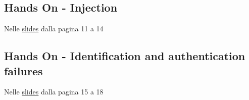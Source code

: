 \subsection{Hands On - Injection}\label{hands-on---injection}

Nelle
\href{https://liveunibo.sharepoint.com/sites/LoPTSI_SedediImola/Shared\%20Documents/Forms/AllItems.aspx?FolderCTID=0x0120005FAD3FA7D5B32649A4AF4CAF3AE22536&id=\%2Fsites\%2FLoPTSI\%5FSedediImola\%2FShared\%20Documents\%2FLABORATORIO\%20DI\%20SICUREZZA\%20DEI\%20SISTEMI\%20E\%20PRIVACY\%2FLaboratorio\%20di\%20sicurezza\%20dei\%20sistemi\%20informatici\%20e\%20privacy\%20\%2D\%2003\%20Sicurezza\%20applicativi\%20Web\%20\%2D\%20V1R0\%5FEsercizi\%2Epdf&parent=\%2Fsites\%2FLoPTSI\%5FSedediImola\%2FShared\%20Documents\%2FLABORATORIO\%20DI\%20SICUREZZA\%20DEI\%20SISTEMI\%20E\%20PRIVACY}{\ul{slides}}
dalla pagina 11 a 14

\subsection{Hands On - Identification and authentication
failures}\label{hands-on---identification-and-authentication-failures}

Nelle
\href{https://liveunibo.sharepoint.com/sites/LoPTSI_SedediImola/Shared\%20Documents/Forms/AllItems.aspx?FolderCTID=0x0120005FAD3FA7D5B32649A4AF4CAF3AE22536&id=\%2Fsites\%2FLoPTSI\%5FSedediImola\%2FShared\%20Documents\%2FLABORATORIO\%20DI\%20SICUREZZA\%20DEI\%20SISTEMI\%20E\%20PRIVACY\%2FLaboratorio\%20di\%20sicurezza\%20dei\%20sistemi\%20informatici\%20e\%20privacy\%20\%2D\%2003\%20Sicurezza\%20applicativi\%20Web\%20\%2D\%20V1R0\%5FEsercizi\%2Epdf&parent=\%2Fsites\%2FLoPTSI\%5FSedediImola\%2FShared\%20Documents\%2FLABORATORIO\%20DI\%20SICUREZZA\%20DEI\%20SISTEMI\%20E\%20PRIVACY}{\ul{slides}}
dalla pagina 15 a 18
